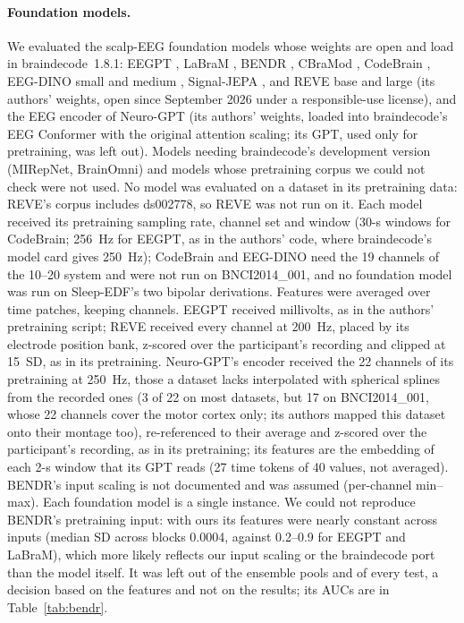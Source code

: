 \documentclass[11pt]{article}
\begin{document}
\paragraph{Foundation models.} We evaluated the scalp-EEG foundation models whose weights are
open and load in braindecode~1.8.1: EEGPT \citep{wang2024eegpt}, LaBraM \citep{jiang2024labram},
BENDR \citep{kostas2021bendr}, CBraMod \citep{wang2025cbramod}, CodeBrain \citep{ma2026codebrain},
EEG-DINO small and medium \citep{wang2025eegdino}, Signal-JEPA \citep{guetschel2024sjepa}, and
REVE base and large \citep{elouahidi2025reve} (its authors' weights, open since September 2026 under
a responsible-use license), and the EEG encoder of Neuro-GPT \citep{cui2024neurogpt} (its authors'
weights, loaded into braindecode's EEG Conformer with the original attention scaling; its GPT,
used only for pretraining, was left out). Models needing braindecode's development version (MIRepNet, BrainOmni)
and models whose pretraining corpus we could not check were not used. No model was evaluated on a
dataset in its pretraining data: REVE's corpus includes ds002778, so REVE was not run on it. Each model received its pretraining sampling rate, channel set and window
(30-s windows for CodeBrain; 256~Hz for EEGPT, as in the authors' code, where braindecode's model
card gives 250~Hz); CodeBrain and EEG-DINO need the 19 channels of the 10--20 system and
were not run on BNCI2014\_001, and no foundation model was run on Sleep-EDF's two bipolar
derivations. Features were averaged over time patches, keeping channels. EEGPT received millivolts,
as in the authors' pretraining script; REVE received every channel at 200~Hz, placed by its
electrode position bank, z-scored over the participant's recording and clipped at 15~SD, as in its
pretraining. Neuro-GPT's encoder received the 22 channels of its pretraining at 250~Hz, those a
dataset lacks interpolated with spherical splines from the recorded ones (3 of 22 on most datasets,
but 17 on BNCI2014\_001, whose 22 channels cover the motor cortex only; its authors mapped this
dataset onto their montage too), re-referenced to their average and z-scored over the participant's
recording, as in its pretraining; its features are the embedding of each 2-s window that its GPT
reads (27 time tokens of 40 values, not averaged). BENDR's input scaling is not documented and was assumed
(per-channel min--max). Each foundation model is a single instance. We could not reproduce BENDR's
pretraining input: with ours its features were nearly constant across inputs (median SD across
blocks 0.0004, against 0.2--0.9 for EEGPT and LaBraM), which more likely reflects our input
scaling or the braindecode port than the model itself. It was left out of the ensemble pools and
of every test, a decision based on the features and not on the results; its AUCs are in
Table~\ref{tab:bendr}.
\end{document}
